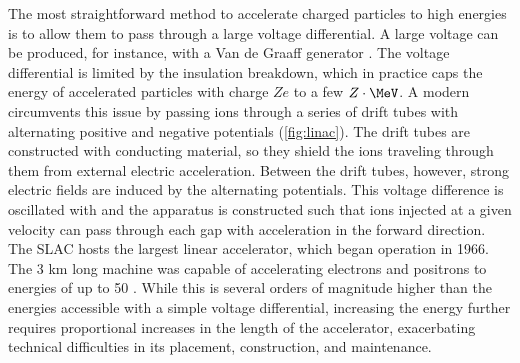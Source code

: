 The most straightforward method to accelerate charged particles to high energies is to allow them to pass through a large voltage differential.
A large voltage can be produced, for instance, with a Van de Graaff generator \cite{PhysRev.43.149}.
The voltage differential is limited by the insulation breakdown, which in practice caps the energy of accelerated particles with charge $Ze$ to a few $Z \cdot\MeV$.
A modern \linac circumvents this issue by passing ions through a series of drift tubes with alternating positive and negative potentials (\cref{fig:linac}).
The drift tubes are constructed with conducting material, so they shield the ions traveling through them from external electric acceleration.
Between the drift tubes, however, strong electric fields are induced by the alternating potentials.
This voltage difference is oscillated with \rf and the apparatus is constructed such that ions injected at a given velocity can pass through each gap with acceleration in the forward direction.
The \ac{SLAC} hosts the largest linear accelerator, which began operation in 1966.
The 3 km long machine was capable of accelerating electrons and positrons to energies of up to 50 \GeV.
While this is several orders of magnitude higher than the energies accessible with a simple voltage differential, increasing the energy further requires proportional increases in the length of the accelerator, exacerbating technical difficulties in its placement, construction, and maintenance.

